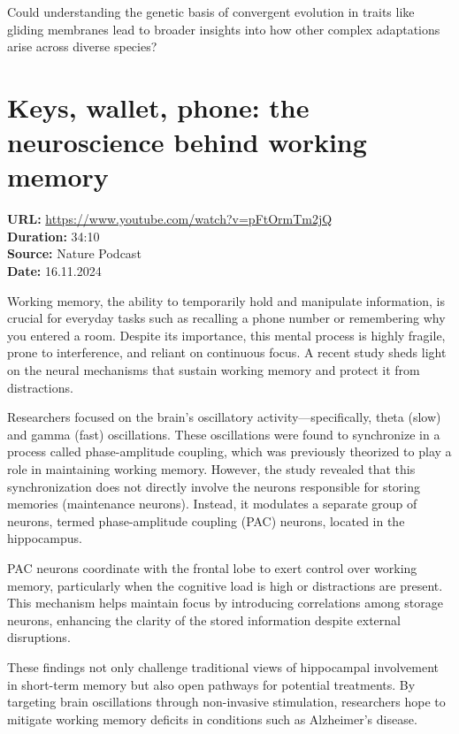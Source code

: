 \documentclass[12pt]{article}
\begin{document}
Could understanding the genetic basis of convergent evolution in traits like gliding membranes lead to broader insights into how other complex adaptations arise across diverse species?  





\newpage

\section{Keys, wallet, phone: the neuroscience behind working memory}
\textbf{URL:} \url{https://www.youtube.com/watch?v=pFtOrmTm2jQ}\\
\textbf{Duration:} 34:10\\
\textbf{Source:} Nature Podcast\\
\textbf{Date:} 16.11.2024


Working memory, the ability to temporarily hold and manipulate information, is crucial for everyday tasks such as recalling a phone number or remembering why you entered a room. Despite its importance, this mental process is highly fragile, prone to interference, and reliant on continuous focus. A recent study sheds light on the neural mechanisms that sustain working memory and protect it from distractions.

Researchers focused on the brain’s oscillatory activity—specifically, theta (slow) and gamma (fast) oscillations. These oscillations were found to synchronize in a process called phase-amplitude coupling, which was previously theorized to play a role in maintaining working memory. However, the study revealed that this synchronization does not directly involve the neurons responsible for storing memories (maintenance neurons). Instead, it modulates a separate group of neurons, termed phase-amplitude coupling (PAC) neurons, located in the hippocampus.

PAC neurons coordinate with the frontal lobe to exert control over working memory, particularly when the cognitive load is high or distractions are present. This mechanism helps maintain focus by introducing correlations among storage neurons, enhancing the clarity of the stored information despite external disruptions.

These findings not only challenge traditional views of hippocampal involvement in short-term memory but also open pathways for potential treatments. By targeting brain oscillations through non-invasive stimulation, researchers hope to mitigate working memory deficits in conditions such as Alzheimer’s disease.\\[5px]
\end{document}
